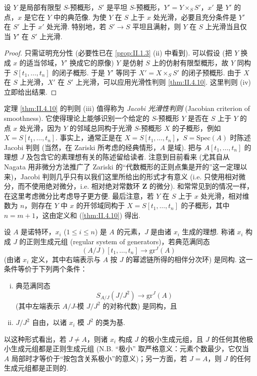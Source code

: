 \begin{corollary}\label{cor:II.4.13}
设 $Y$ 是局部有限型 $S$-预概形，$S'$ 是平坦 $S$-预概形，$Y' = Y \times_S S'$，$x'$ 是 $Y'$ 的点，$x$ 是它在 $Y$ 中的典范像. 为使 $Y$ 在 $S$ 上于 $x$ 处光滑，必要且充分条件是 $Y'$ 在 $S'$ 上于 $x'$ 处光滑. 特别地，若 $S' \to S$ 平坦且满射，则 $Y$ 在 $S$ 上光滑当且仅当 $Y'$ 在 $S'$ 上光滑.
\end{corollary}

\begin{proof}
只需证明充分性 (必要性已在 \ref{prop:II.1.3} (ii) 中看到). 可以假设 (把 $Y$ 换成 $x$ 的适当邻域，$Y'$ 换成它的原像) $Y$ 是仿射 $S$ 上的仿射有限型概形，故 $Y$ 同构于 $S[t_1, \dots, t_n]$ 的闭子概形. 于是 $Y'$ 等同于 $X' = X \times_S S'$ 的闭子预概形. 由于 $X$ 在 $S$ 上光滑，$X'$ 在 $S'$ 上光滑，可以应用光滑性判则 \ref{thm:II.4.10}. 这里判则 (iv) 立即给出结果.
\end{proof}

\begin{remark}\label{rem:II.4.14}
定理 \ref{thm:II.4.10} 的判则 (iii) 值得称为 \emph{Jacobi 光滑性判则} (Jacobian criterion of smoothness). 它使得理论上能够识别一个给定的 $S$-预概形 $Y$ 是否在 $S$ 上于 $Y$ 的点 $x$ 处光滑，因为 $Y$ 的邻域总同构于光滑 $S$-预概形 $X$ 的子概形，例如 $X = S[t_1, \dots, t_n]$. 事实上，通常正是在 $X = S[t_1, \dots, t_n]$，$S = \mathrm{Spec}(A)$ 时陈述 Jacobi 判则 (当然，在 Zariski 所考虑的经典情形，$A$ 是域). 把与 $A[t_1, \dots, t_n]$ 的理想 $J$ 及包含它的素理想有关的陈述留给读者. 注意到目前看来 (尤其自从 Nagata 用非微分方法推广了 Zariski 的``代数概形的正则点集是开的''这一定理以来)，Jacobi 判则几乎只有以我们这里所给出的形式才有意义 (i.e. 只使用相对微分，而不使用绝对微分，i.e. 相对绝对常数环 $\mathbf{Z}$ 的微分). 和常常见到的情况一样，在这里考虑微分比考虑导子更方便. 最后注意，若 $Y$ 在 $S$ 上于 $x$ 处光滑，相对维数为 $n$，则存在 $Y$ 中 $x$ 的开邻域同构于 $X = S[t_1, \dots, t_n]$ 的子概形，其中 $n = m + 1$，这由定义和 (\ref{thm:II.4.10}) 得出.
\end{remark}

设 $A$ 是诺特环，$x_i$ ($1 \leqslant i \leqslant n$) 是 $A$ 的元素，$J$ 是由诸 $x_i$ 生成的理想. 称诸 $x_i$ 构成 $J$ 的正则生成元组 (regular system of generators)，若典范满同态
\[
(A/J)[t_1, \dots, t_n] \longrightarrow \mathrm{gr}^{J}(A)
\]
(由诸 $x_i$ 定义，其中右端表示与 $A$ 按 $J$ 的幂滤链所得的相伴分次环) 是同构. 这一条件等价于下列两个条件：
\begin{enumerate}[(i)]
\item 典范满同态
\[
S_{A/J}(J/J^2) \longrightarrow \mathrm{gr}^{J}(A)
\]
(其中左端表示 $A/J$-模 $J/J^2$ 的对称代数) 是同构，且
\item $J/J^2$ 自由，以诸 $x_i$ 模 $J^2$ 的类为基.
\end{enumerate}
以这种形式看出，若 $J \neq A$，则诸 $x_i$ 构成 $J$ 的极小生成元组，且 $J$ 的任何其他极小生成元组都是正则生成元组 (N.B. ``极小'' 取严格意义：元素个数最少，它仅当 $A$ 局部时才等价于``按包含关系极小''的意义)；另一方面，若 $J = A$，则 $J$ 的任何生成元组都是正则的.

